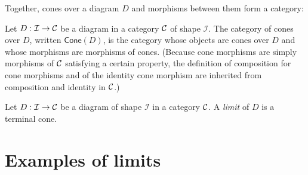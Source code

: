 Together, cones over a diagram \(D\) and morphisms between them form a category:
\begin{definition}
  Let \(D :\mathcal I \to \mathcal C\) be a diagram in a category \(\mathcal C\) of shape \(\mathcal I\).
  The category of cones over \(D\), written \(\mathsf{Cone}(D)\),
  is the category whose objects are cones over \(D\) and whose morphisms are morphisms of cones.
  (Because cone morphisms are simply morphisms of \(\mathcal C\) satisfying a certain property,
   the definition of composition for cone morphisms and of the identity cone morphism are inherited from
   composition and identity in \(\mathcal C\).)
\end{definition}

\begin{definition}[Limit]
  Let \(D : \mathcal I \to \mathcal C\) be a diagram of shape \(\mathcal I\)
  in a category \(\mathcal C\).
  A \emph{limit} of \(D\) is a terminal cone.
\end{definition}



\section{Examples of limits}

